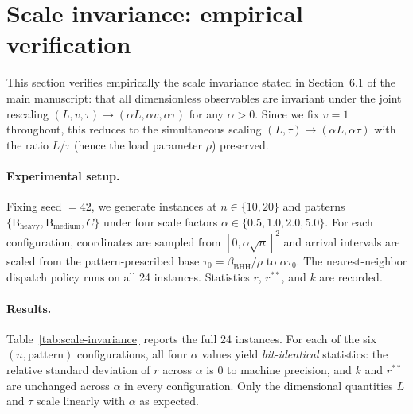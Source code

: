 \documentclass[11pt]{article}
\theoremstyle{plain}
\theoremstyle{definition}
\theoremstyle{remark}
\begin{document}
\section{Scale invariance: empirical verification}
\label{app:scale-invariance}

This section verifies empirically the scale invariance stated in Section~6.1 of the main manuscript: that all dimensionless observables are invariant under the joint rescaling $(L, v, \tau) \to (\alpha L, \alpha v, \alpha \tau)$ for any $\alpha > 0$. Since we fix $v = 1$ throughout, this reduces to the simultaneous scaling $(L, \tau) \to (\alpha L, \alpha \tau)$ with the ratio $L/\tau$ (hence the load parameter $\rho$) preserved.

\paragraph{Experimental setup.} Fixing seed $=42$, we generate instances at $n\in\{10,20\}$ and patterns $\{\text{B}_{\text{heavy}},\text{B}_{\text{medium}}, C\}$ under four scale factors $\alpha\in\{0.5,1.0,2.0,5.0\}$. For each configuration, coordinates are sampled from $[0,\alpha\sqrt{n}]^2$ and arrival intervals are scaled from the pattern-prescribed base $\tau_0=\beta_{\mathrm{BHH}}/\rho$ to $\alpha\tau_0$. The nearest-neighbor dispatch policy runs on all 24 instances. Statistics $r$, $r^{\ast\ast}$, and $k$ are recorded.

\paragraph{Results.} Table~\ref{tab:scale-invariance} reports the full 24 instances. For each of the six $(n,\text{pattern})$ configurations, all four $\alpha$ values yield \emph{bit-identical} statistics: the relative standard deviation of $r$ across $\alpha$ is $0$ to machine precision, and $k$ and $r^{\ast\ast}$ are unchanged across $\alpha$ in every configuration. Only the dimensional quantities $L$ and $\tau$ scale linearly with $\alpha$ as expected.
\end{document}
